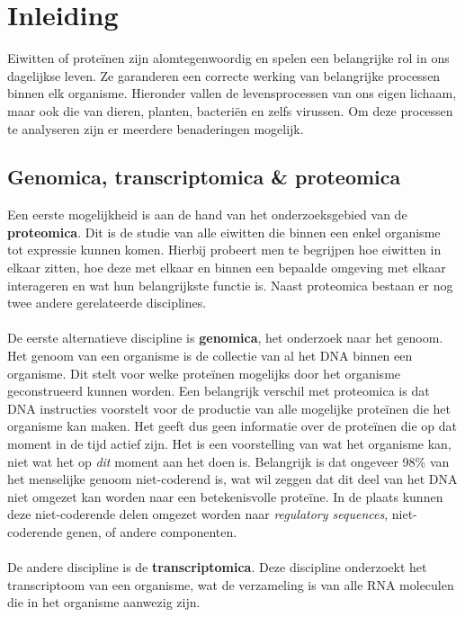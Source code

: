 \chapter{Inleiding}\label{ch:introductie}

Eiwitten of proteïnen zijn alomtegenwoordig en spelen een belangrijke rol in ons dagelijkse leven.
Ze garanderen een correcte werking van belangrijke processen binnen elk organisme.
Hieronder vallen de levensprocessen van ons eigen lichaam, maar ook die van dieren, planten, bacteriën en zelfs virussen.
Om deze processen te analyseren zijn er meerdere benaderingen mogelijk.


\section{Genomica, transcriptomica \& proteomica}\label{sec:genomica-transcriptomica-&-proteomica}
Een eerste mogelijkheid is aan de hand van het onderzoeksgebied van de \textbf{proteomica}.
Dit is de studie van alle eiwitten die binnen een enkel organisme tot expressie kunnen komen.
Hierbij probeert men te begrijpen hoe eiwitten in elkaar zitten, hoe deze met elkaar en binnen een bepaalde omgeving met elkaar interageren en wat hun belangrijkste functie is.
Naast proteomica bestaan er nog twee andere gerelateerde disciplines.
\\ \\
De eerste alternatieve discipline is \textbf{genomica}, het onderzoek naar het genoom.
Het genoom van een organisme is de collectie van al het DNA binnen een organisme.
Dit stelt voor welke proteïnen mogelijks door het organisme geconstrueerd kunnen worden.
Een belangrijk verschil met proteomica is dat DNA instructies voorstelt voor de productie van alle mogelijke proteïnen die het organisme kan maken.
Het geeft dus geen informatie over de proteïnen die op dat moment in de tijd actief zijn.
Het is een voorstelling van wat het organisme kan, niet wat het op \textit{dit} moment aan het doen is.
Belangrijk is dat ongeveer 98\% van het menselijke genoom niet-coderend is, wat wil zeggen dat dit deel van het DNA niet omgezet kan worden naar een betekenisvolle proteïne.
In de plaats kunnen deze niet-coderende delen omgezet worden naar \textit{regulatory sequences}, niet-coderende genen, of andere componenten.
\\ \\
De andere discipline is de \textbf{transcriptomica}.
Deze discipline onderzoekt het transcriptoom van een organisme, wat de verzameling is van alle RNA moleculen die in het organisme aanwezig zijn.
